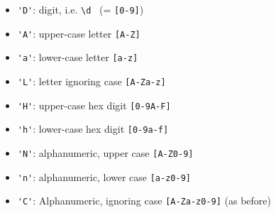 \documentclass{article}
\begin{document}
\begin{itemize}
  \item \verb+'D'+: digit, i.e. \verb+\d+ \ (= \verb+[0-9]+)
  \item \verb+'A'+: upper-case letter \verb+[A-Z]+
  \item \verb+'a'+: lower-case letter \verb+[a-z]+
  \item \verb+'L'+: letter ignoring case \verb+[A-Za-z]+
  \item \verb+'H'+: upper-case hex digit \verb+[0-9A-F]+
  \item \verb+'h'+: lower-case hex digit \verb+[0-9a-f]+
  \item \verb+'N'+: alphanumeric, upper case \verb+[A-Z0-9]+
  \item \verb+'n'+: alphanumeric, lower case \verb+[a-z0-9]+
  \item \verb+'C'+: Alphanumeric, ignoring case \verb+[A-Za-z0-9]+ (as before)
\end{itemize}
\end{document}
